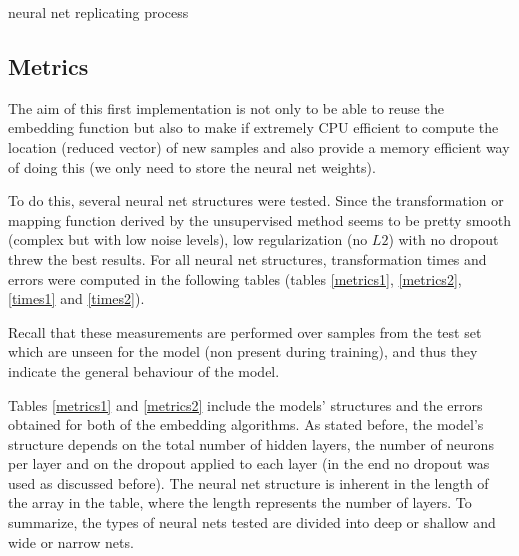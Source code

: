 \documentclass[a4paper,11pt,spanish]{report}
\makeatletter
\def\BState{\State\hskip-\ALG@thistlm}
\makeatother
\begin{document}
\begin{algorithm}
\caption{neural net replicating process}
\end{algorithm}

\subsection{Metrics}
\label{ssec:met1}

The aim of this first implementation is not only to be able to reuse the embedding function but also to make if extremely CPU efficient to compute the location (reduced vector) of new samples and also provide a memory efficient way of doing this (we only need to store the neural net weights). 

To do this, several neural net structures were tested. Since the transformation or mapping function derived by the unsupervised method seems to be pretty smooth (complex but with low noise levels), low regularization (no $L2$) with no dropout threw the best results. For all neural net structures, transformation times and errors were computed in the following tables (tables \ref{metrics1}, \ref{metrics2}, \ref{times1} and \ref{times2}).

Recall that these measurements are performed over samples from the test set which are unseen for the model (non present during training), and thus they indicate the general behaviour of the model.

Tables \ref{metrics1} and \ref{metrics2} include the models' structures and the errors obtained for both of the embedding algorithms. As stated before, the model's structure depends on the total number of hidden layers, the number of neurons per layer and on the dropout applied to each layer (in the end no dropout was used as discussed before). The neural net structure is inherent in the length of the array in the table, where the length represents the number of layers. To summarize, the types of neural nets tested are divided into deep or shallow and wide or narrow nets.
\end{document}
